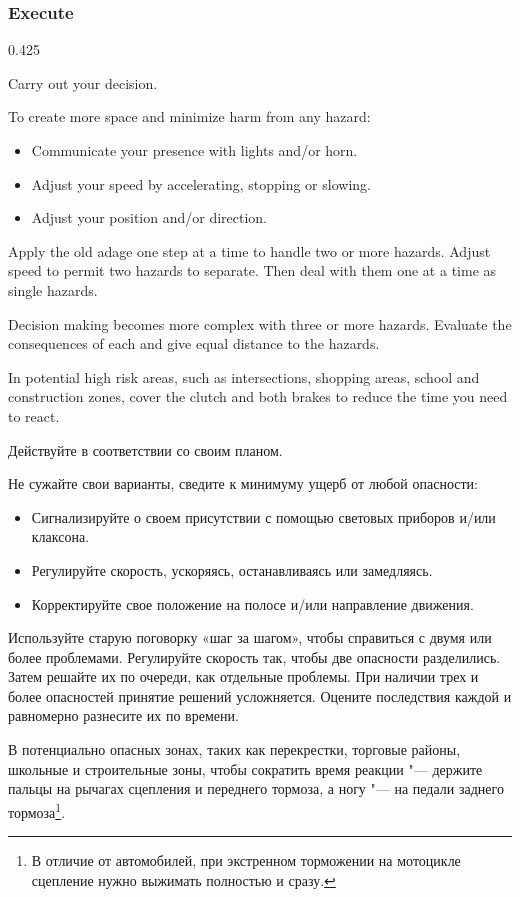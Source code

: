 \subsubsection*{Execute}


\begin{langblock}{0.425}
	\begin{eng}
	
	Carry out your decision.
	
	To create more space and minimize harm from any hazard:
	
	\begin{itemize}[noitemsep]
		\item Communicate your presence with lights and/or horn.
		\item Adjust your speed by accelerating, stopping or slowing.
		\item Adjust your position and/or direction.
	\end{itemize}
	
	Apply the old adage one step at a time to handle two or more hazards. Adjust speed to permit two hazards to separate. Then deal with them one at a time as single hazards.
	
	Decision making becomes more complex with three or more hazards.  Evaluate the consequences of each and give equal distance to the hazards.
	
	In potential high risk areas, such as intersections, shopping areas, school and construction zones, cover the clutch and both brakes to reduce the time you need to react.
	\end{eng}
	\begin{rus}
		Действуйте в соответствии со своим планом.
		
		Не сужайте свои варианты, сведите к минимуму ущерб от любой опасности:
		
		\begin{itemize}[noitemsep]
			\item Сигнализируйте о своем присутствии с помощью световых приборов и/или клаксона.
			\item Регулируйте скорость, ускоряясь, останавливаясь или замедляясь.
			\item Корректируйте свое положение на полосе и/или направление движения.
		\end{itemize}
		
		Используйте старую поговорку «шаг за шагом», чтобы справиться с двумя или более проблемами. Регулируйте скорость так, чтобы две опасности разделились. Затем решайте их по очереди, как отдельные проблемы.
		При наличии трех и более опасностей принятие решений усложняется. Оцените последствия каждой и равномерно разнесите их по времени.
		
		В потенциально опасных зонах, таких как перекрестки, торговые районы, школьные и строительные зоны, чтобы сократить время реакции "--- держите пальцы на рычагах сцепления и переднего тормоза, а ногу "--- на педали заднего тормоза\footnote{В отличие от автомобилей, при экстренном торможении на мотоцикле сцепление нужно выжимать полностью и сразу.}.
\end{rus}
\end{langblock}
